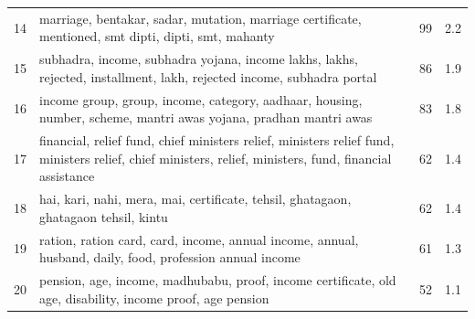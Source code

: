 \begin{table}[htbp]
\begin{tabular}{rlp{7cm}r}
14 & marriage, bentakar, sadar, mutation, marriage certificate, mentioned, smt dipti, dipti, smt, mahanty & 99 & 2.2 \\
15 & subhadra, income, subhadra yojana, income lakhs, lakhs, rejected, installment, lakh, rejected income, subhadra portal & 86 & 1.9 \\
16 & income group, group, income, category, aadhaar, housing, number, scheme, mantri awas yojana, pradhan mantri awas & 83 & 1.8 \\
17 & financial, relief fund, chief ministers relief, ministers relief fund, ministers relief, chief ministers, relief, ministers, fund, financial assistance & 62 & 1.4 \\
18 & hai, kari, nahi, mera, mai, certificate, tehsil, ghatagaon, ghatagaon tehsil, kintu & 62 & 1.4 \\
19 & ration, ration card, card, income, annual income, annual, husband, daily, food, profession annual income & 61 & 1.3 \\
20 & pension, age, income, madhubabu, proof, income certificate, old age, disability, income proof, age pension & 52 & 1.1 \\
\bottomrule
\end{tabular}
\end{table}